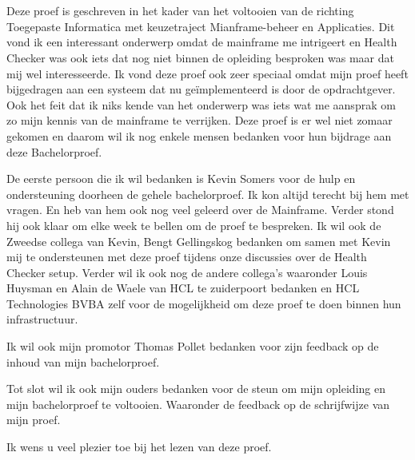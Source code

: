 
\chapter*{}
\label{ch:voorwoord}


Deze proef is geschreven in het kader van het voltooien van de richting Toegepaste Informatica met keuzetraject Mianframe-beheer en Applicaties. Dit vond ik een interessant onderwerp omdat de mainframe me intrigeert en Health Checker was ook iets dat nog niet binnen de opleiding besproken was maar dat mij wel interesseerde. Ik vond deze proef ook zeer speciaal omdat mijn proef heeft bijgedragen aan een systeem dat nu geïmplementeerd is door de opdrachtgever. Ook het feit dat ik niks kende van het onderwerp was iets wat me aansprak om zo mijn kennis van de mainframe te verrijken. Deze proef is er wel niet zomaar gekomen en daarom wil ik nog enkele mensen bedanken voor hun bijdrage aan deze Bachelorproef.

De eerste persoon die ik wil bedanken is Kevin Somers voor de hulp en ondersteuning doorheen de gehele bachelorproef. Ik kon altijd terecht bij hem met vragen. En heb van hem ook nog veel geleerd over de Mainframe. Verder stond hij ook klaar om elke week te bellen om de proef te bespreken. Ik wil ook de Zweedse collega van Kevin, Bengt Gellingskog bedanken om samen met Kevin mij te ondersteunen met deze proef tijdens onze discussies over de Health Checker setup. Verder wil ik ook nog de andere collega's waaronder Louis Huysman en Alain de Waele van HCL te zuiderpoort bedanken en HCL Technologies BVBA zelf voor de mogelijkheid om deze proef te doen binnen hun infrastructuur.

Ik wil ook mijn promotor Thomas Pollet bedanken voor zijn feedback op de inhoud van mijn bachelorproef.

Tot slot wil ik ook mijn ouders bedanken voor de steun om mijn opleiding en mijn bachelorproef te voltooien. Waaronder de feedback op de schrijfwijze van mijn proef.

Ik wens u veel plezier toe bij het lezen van deze proef.